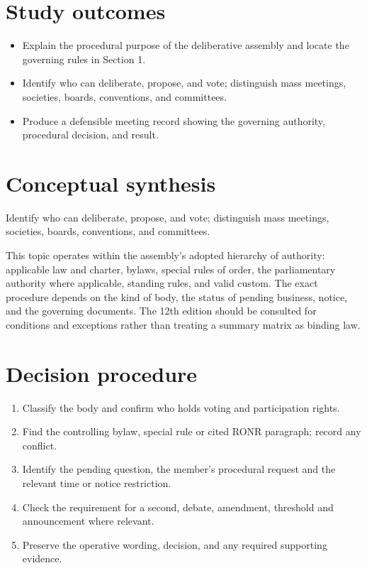 \documentclass[11pt]{article}
\begin{document}
\SuiteOpen
{}
\section{Study outcomes}
\begin{itemize}[leftmargin=*,itemsep=4pt]
\item Explain the procedural purpose of the deliberative assembly and locate the governing rules in Section 1.
\item Identify who can deliberate, propose, and vote; distinguish mass meetings, societies, boards, conventions, and committees.
\item Produce a defensible meeting record showing the governing authority, procedural decision, and result.
\end{itemize}

\section{Conceptual synthesis}
Identify who can deliberate, propose, and vote; distinguish mass meetings, societies, boards, conventions, and committees.

This topic operates within the assembly’s adopted hierarchy of authority: applicable law and charter, bylaws, special rules of order, the parliamentary authority where applicable, standing rules, and valid custom. The exact procedure depends on the kind of body, the status of pending business, notice, and the governing documents. The 12th edition should be consulted for conditions and exceptions rather than treating a summary matrix as binding law.
\section{Decision procedure}
\begin{enumerate}[leftmargin=*,itemsep=4pt]
\item Classify the body and confirm who holds voting and participation rights.
\item Find the controlling bylaw, special rule or cited RONR paragraph; record any conflict.
\item Identify the pending question, the member’s procedural request and the relevant time or notice restriction.
\item Check the requirement for a second, debate, amendment, threshold and announcement where relevant.
\item Preserve the operative wording, decision, and any required supporting evidence.
\end{enumerate}
\end{document}
